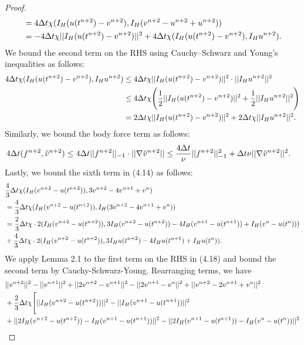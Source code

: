\documentclass[11pt,a4paper]{article}
\begin{document}
\begin{proof}
\begin{align}
        &=4\Delta t\chi(I_H(u(t^{n+2})-v^{n+2}),I_H(v^{n+2}-u^{n+2}+u^{n+2})) \notag \\
        &=-4\Delta t\chi||I_H(u(t^{n+2})-v^{n+2})||^2+4\Delta t\chi(I_H(u(t^{n+2})-v^{n+2}),I_Hu^{n+2}).
    \end{align}
    We bound the second term on the RHS using Cauchy–Schwarz and Young's inequalities as follows:
    \begin{align}
        4\Delta t\chi(I_H(u(t^{n+2})-v^{n+2}),I_Hu^{n+2}) &\leq 4\Delta t\chi ||I_H(u(t^{n+2})-v^{n+2})||^2 \cdot ||I_Hu^{n+2}||^2 \notag \\
        &\leq 4\Delta t\chi \Bigg(\frac{1}{2}||I_H(u(t^{n+2})-v^{n+2})||^2+\frac{1}{2}||I_Hu^{n+2}||^2\Bigg) \notag \\
        &=2\Delta t\chi ||I_H(u(t^{n+2})-v^{n+2})||^2+2\Delta t\chi ||I_Hu^{n+2}||^2.
    \end{align}
    Similarly, we bound the body force term as follows:
    \begin{align}
        4\Delta t(f^{n+2},\Tilde{v}^{n+2})
        &\leq 4\Delta t||f^{n+2}||_{-1}\cdot ||\nabla \Tilde{v}^{n+2}|| \leq \frac{4\Delta t}{\nu}||f^{n+2}||_{-1}^2+\Delta t\nu||\nabla \Tilde{v}^{n+2}||^2.
    \end{align}
    Lastly, we bound the sixth term in (4.14) as follows:
    \begin{align}
        &\frac{4}{3}\Delta t\chi(I_H(v^{n+2}-u(t^{n+2})),3v^{n+2}-4v^{n+1}+v^n) \notag \\
        &=\frac{4}{3}\Delta t\chi(I_H(v^{n+2}-u(t^{n+2})),I_H(3v^{n+2}-4v^{n+1}+v^n)) \notag \\
        &=\frac{2}{3}\Delta t\chi \cdot 2(I_H(v^{n+2}-u(t^{n+2})),3I_H(v^{n+2}-u(t^{n+2}))-4I_H(v^{n+1}-u(t^{n+1}))+I_H(v^n-u(t^n))) \notag \\
        &+\frac{4}{3}\Delta t\chi \cdot 2(I_H(v^{n+2}-u(t^{n+2})),3I_Hu(t^{n+2})-4I_Hu(t^{n+1})+I_Hu(t^n)) .
    \end{align}
    We apply Lemma 2.1 to the first term on the RHS in (4.18) and bound the second term by Cauchy-Schwarz-Young. Rearranging terms, we have
    \begin{align}
        &||v^{n+2}||^2-||v^{n+1}||^2+||2v^{n+2}-v^{n+1}||^2-||2v^{n+1}-v^n||^2+||v^{n+2}-2v^{n+1}+v^n||^2 \notag \\
        &+\frac{2}{3}\Delta t\chi\Bigg[||I_H(v^{n+2}-u(t^{n+2}))||^2-||I_H(v^{n+1}-u(t^{n+1}))||^2 \notag \\
        &+||2I_H(v^{n+2}-u(t^{n+2}))-I_H(v^{n+1}-u(t^{n+1}))||^2-||2I_H(v^{n+1}-u(t^{n+1}))-I_H(v^n-u(t^n))||^2 \notag \\

\end{align}
\end{proof}
\end{document}
